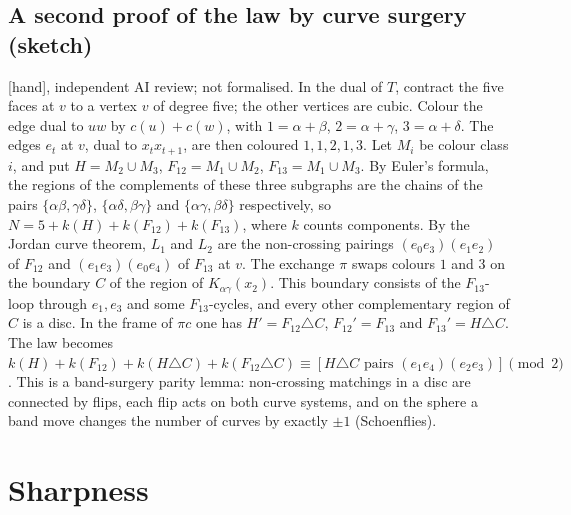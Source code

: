 \documentclass[11pt]{article}
\theoremstyle{definition}
\newcommand{\lab}[1]{\textsf{[#1]}}
\begin{document}
\subsection{A second proof of the law by curve surgery (sketch)}\label{sec:surgery}
\lab{hand}, independent AI review; not formalised. In the dual of $T$, contract the five faces at $v$ to a vertex $v$ of degree five; the other vertices are cubic. Colour the edge dual to $uw$ by $c(u)+c(w)$, with $1=\alpha{+}\beta$, $2=\alpha{+}\gamma$, $3=\alpha{+}\delta$. The edges $e_t$ at $v$, dual to $x_tx_{t+1}$, are then coloured $1,1,2,1,3$. Let $M_i$ be colour class $i$, and put $H=M_2\cup M_3$, $F_{12}=M_1\cup M_2$, $F_{13}=M_1\cup M_3$. By Euler's formula, the regions of the complements of these three subgraphs are the chains of the pairs $\{\alpha\beta,\gamma\delta\}$, $\{\alpha\delta,\beta\gamma\}$ and $\{\alpha\gamma,\beta\delta\}$ respectively, so $N=5+k(H)+k(F_{12})+k(F_{13})$, where $k$ counts components. By the Jordan curve theorem, $L_1$ and $L_2$ are the non-crossing pairings $(e_0e_3)(e_1e_2)$ of $F_{12}$ and $(e_1e_3)(e_0e_4)$ of $F_{13}$ at $v$. The exchange $\pi$ swaps colours $1$ and $3$ on the boundary $C$ of the region of $K_{\alpha\gamma}(x_2)$. This boundary consists of the $F_{13}$-loop through $e_1,e_3$ and some $F_{13}$-cycles, and every other complementary region of $C$ is a disc. In the frame of $\pi c$ one has $H'=F_{12}\triangle C$, $F_{12}'=F_{13}$ and $F_{13}'=H\triangle C$. The law becomes $k(H)+k(F_{12})+k(H\triangle C)+k(F_{12}\triangle C)\equiv[H\triangle C\text{ pairs }(e_1e_4)(e_2e_3)]\pmod 2$. This is a band-surgery parity lemma: non-crossing matchings in a disc are connected by flips, each flip acts on both curve systems, and on the sphere a band move changes the number of curves by exactly $\pm1$ (Schoenflies).

\section{Sharpness}\label{sec:sharp}
\end{document}
